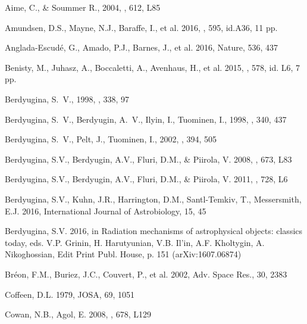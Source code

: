 \documentclass{emulateapj}
\begin{document}
\begin{thebibliography}{}

Aime, C., \& Soummer R.,
   2004, \apjl, 612, L85
   
Amundsen, D.S., Mayne, N.J., Baraffe, I., et al.
   2016, \aap, 595, id.A36, 11 pp.  

Anglada-Escud\'e, G., Amado, P.J., Barnes, J., et al.
   2016, Nature, 536, 437
   
Benisty, M., Juhasz, A., Boccaletti, A., Avenhaus, H., et al.
   2015, \aap, 578, id. L6, 7 pp.
   
Berdyugina, S.~V., 
  1998, \aap, 338, 97
  
Berdyugina, S.~V., Berdyugin, A.~V., Ilyin, I., Tuominen, I., 
  1998, \aap, 340, 437
 
Berdyugina, S.~V., Pelt, J., Tuominen, I., 
  2002, \aap, 394, 505

Berdyugina, S.V., Berdyugin, A.V., Fluri, D.M., \& Piirola, V. 
   2008, \apjl, 673, L83

Berdyugina, S.V., Berdyugin, A.V., Fluri, D.M., \& Piirola, V. 
   2011, \apjl, 728, L6
   
Berdyugina, S.V., Kuhn, J.R., Harrington, D.M., Santl-Temkiv, T., Messersmith, E.J.
   2016, International Journal of Astrobiology, 15, 45

Berdyugina, S.V. 
   2016, in Radiation mechanisms of astrophysical objects: classics today, 
   eds. V.P. Grinin, H. Harutyunian, V.B. Il'in, A.F. Kholtygin, A. Nikoghossian,
   Edit Print Publ. House, p. 151 (arXiv:1607.06874)
   

Br\'eon, F.M., Buriez, J.C., Couvert, P., et al.    
   2002, Adv. Space Res., 30, 2383
   
Coffeen, D.L. 
   1979, JOSA, 69, 1051
   
Cowan, N.B., Agol, E. 
   2008, \apjl, 678, L129
   

\end{thebibliography}
\end{document}
